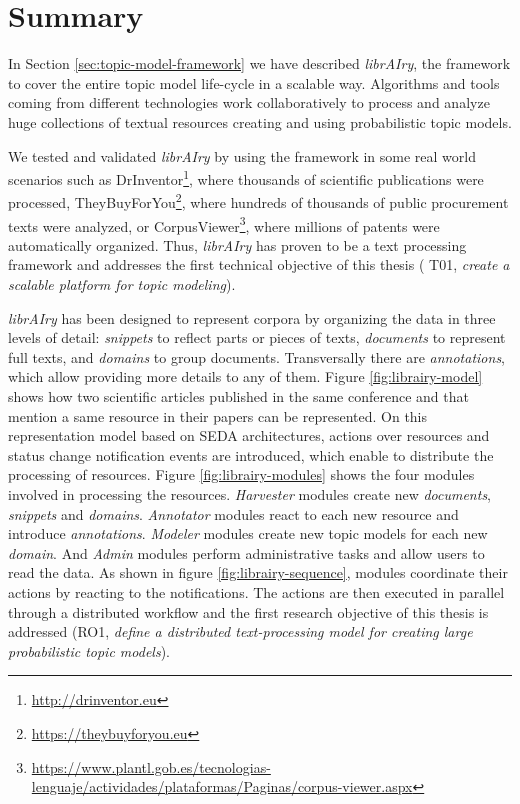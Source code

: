 \section{Summary}

In Section \ref{sec:topic-model-framework} we have described \textit{librAIry}, the framework to cover the entire topic model life-cycle in a scalable way. Algorithms and tools coming from different technologies work collaboratively to process and analyze huge collections of textual resources creating and using probabilistic topic models. 

We tested and validated \textit{librAIry} by using the framework in some real world scenarios such as DrInventor\footnote{\url{http://drinventor.eu}}, where thousands of scientific publications were processed, TheyBuyForYou\footnote{\url{https://theybuyforyou.eu}}, where hundreds of thousands of public procurement texts were analyzed, or 
CorpusViewer\footnote{\url{https://www.plantl.gob.es/tecnologias-lenguaje/actividades/plataformas/Paginas/corpus-viewer.aspx}}, where millions of patents were automatically organized. Thus, \textit{librAIry} has proven to be a text processing framework and addresses the first technical objective of this thesis ( T01, \textit{create a scalable platform for  topic modeling}).

\textit{librAIry} has been designed to represent corpora by organizing the data in three levels of detail: \textit{snippets} to reflect parts or pieces of texts, \textit{documents} to represent full texts, and \textit{domains} to group documents. Transversally there are \textit{annotations}, which allow providing more details to any of them. Figure \ref{fig:librairy-model} shows how two scientific articles published in the same conference and that mention a same resource in their papers can be represented. On this representation model based on SEDA architectures, actions over resources and status change notification events are introduced, which enable to distribute the processing of resources. Figure \ref{fig:librairy-modules} shows the four modules involved in processing the resources. \textit{Harvester} modules create new \textit{documents}, \textit{snippets} and \textit{domains}. \textit{Annotator} modules react to each new resource and introduce \textit{annotations}. \textit{Modeler} modules create new topic models for each new \textit{domain}. And \textit{Admin} modules perform administrative tasks and allow users to read the data. As shown in figure \ref{fig:librairy-sequence}, modules coordinate their actions by reacting to the notifications. The actions are then executed in parallel through a distributed workflow and the first research objective of this thesis is addressed (RO1, \textit{define a distributed text-processing model for creating large probabilistic topic models}).

